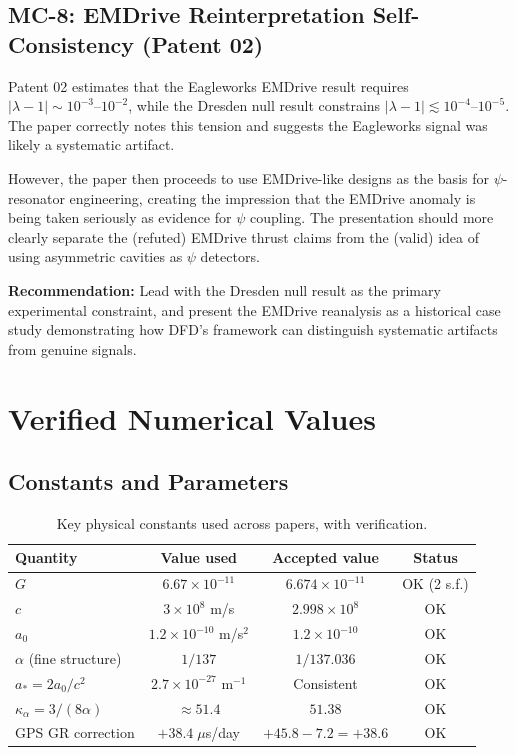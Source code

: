 \documentclass[12pt,a4paper]{article}
\begin{document}
\subsection{MC-8: EMDrive Reinterpretation Self-Consistency (Patent 02)}

\begin{moderate}
Patent 02 estimates that the Eagleworks EMDrive result requires
$|\lambda - 1| \sim 10^{-3}\text{--}10^{-2}$, while the Dresden null
result constrains $|\lambda - 1| \lesssim 10^{-4}\text{--}10^{-5}$.
The paper correctly notes this tension and suggests the Eagleworks
signal was likely a systematic artifact.

However, the paper then proceeds to use EMDrive-like designs as
the basis for $\psi$-resonator engineering, creating the impression
that the EMDrive anomaly is being taken seriously as evidence for
$\psi$ coupling. The presentation should more clearly separate the
(refuted) EMDrive thrust claims from the (valid) idea of using
asymmetric cavities as $\psi$ detectors.

\textbf{Recommendation:} Lead with the Dresden null result as the
primary experimental constraint, and present the EMDrive reanalysis
as a historical case study demonstrating how DFD's framework can
distinguish systematic artifacts from genuine signals.
\end{moderate}

\section{Verified Numerical Values}
\label{sec:numerical}

\subsection{Constants and Parameters}

\begin{table}[H]
\centering
\caption{Key physical constants used across papers, with verification.}
\begin{tabular}{lccc}
\toprule
\textbf{Quantity} & \textbf{Value used} & \textbf{Accepted value} & \textbf{Status} \\
\midrule
$G$ & $6.67\times 10^{-11}$ & $6.674\times 10^{-11}$ & OK (2 s.f.) \\
$c$ & $3\times 10^8$ m/s & $2.998\times 10^8$ & OK \\
$a_0$ & $1.2\times 10^{-10}$ m/s$^2$ & $1.2\times 10^{-10}$ & OK \\
$\alpha$ (fine structure) & $1/137$ & $1/137.036$ & OK \\
$a_* = 2a_0/c^2$ & $2.7\times 10^{-27}$ m$^{-1}$ & Consistent & OK \\
$\kappa_\alpha = 3/(8\alpha)$ & $\approx 51.4$ & $51.38$ & OK \\
GPS GR correction & $+38.4\;\mu$s/day & $+45.8 - 7.2 = +38.6$ & OK \\
\bottomrule
\end{tabular}
\end{table}
\end{document}
